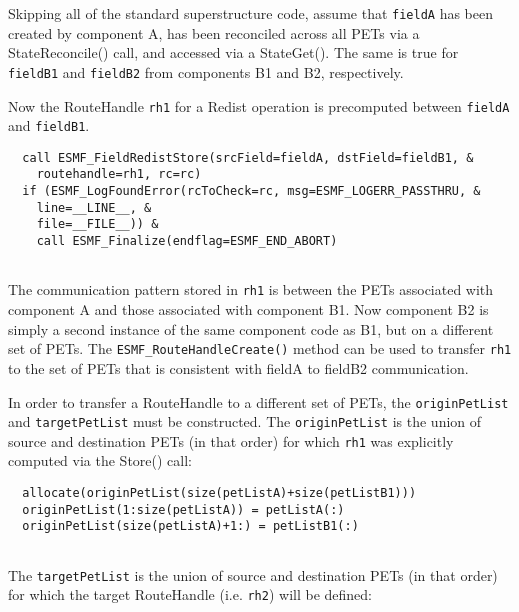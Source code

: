 
   Skipping all of the standard superstructure code, assume that {\tt fieldA}
   has been created by component A, has been reconciled across all PETs via
   a StateReconcile() call, and accessed via a StateGet(). The same is true for
   {\tt fieldB1} and {\tt fieldB2} from components B1 and B2, respectively.
  
   Now the RouteHandle {\tt rh1} for a Redist operation is precomputed between 
   {\tt fieldA} and {\tt fieldB1}. 

 \begin{verbatim}
  call ESMF_FieldRedistStore(srcField=fieldA, dstField=fieldB1, &
    routehandle=rh1, rc=rc)
  if (ESMF_LogFoundError(rcToCheck=rc, msg=ESMF_LOGERR_PASSTHRU, &
    line=__LINE__, &
    file=__FILE__)) &
    call ESMF_Finalize(endflag=ESMF_END_ABORT)
 
\end{verbatim}
 

   The communication pattern stored in {\tt rh1} is between the PETs associated
   with component A and those associated with component B1. Now component B2 is
   simply a second instance of the same component code as B1, but on a different
   set of PETs. The {\tt ESMF\_RouteHandleCreate()} method can be used to 
   transfer {\tt rh1} to the set of PETs that is consistent with fieldA to 
   fieldB2 communication.
  
   In order to transfer a RouteHandle to a different set of PETs, the 
   {\tt originPetList} and {\tt targetPetList} must be constructed. The
   {\tt originPetList} is the union of source and destination PETs (in that
   order) for which {\tt rh1} was explicitly computed via the Store() call: 

 \begin{verbatim}
  allocate(originPetList(size(petListA)+size(petListB1)))
  originPetList(1:size(petListA)) = petListA(:)
  originPetList(size(petListA)+1:) = petListB1(:)
 
\end{verbatim}
 

   The {\tt targetPetList} is the union of source and destination PETs (in that
   order) for which the target RouteHandle (i.e. {\tt rh2}) will be defined: 

